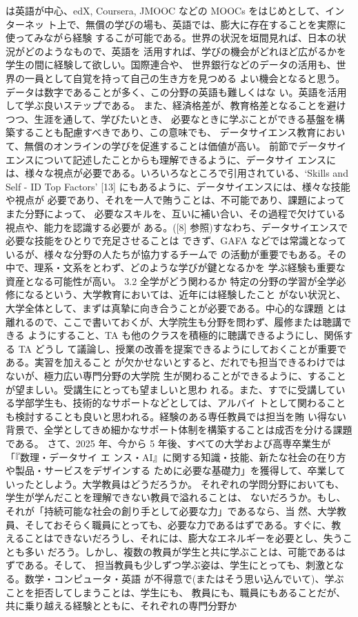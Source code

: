 \documentclass[
]{book}
\theoremstyle{definition}
\theoremstyle{definition}
\theoremstyle{definition}
\theoremstyle{definition}
\theoremstyle{remark}
\begin{document}
は英語が中心、edX, Coursera, JMOOC などの MOOCs をはじめとして、インターネッ ト上で、無償の学びの場も、英語では、膨大に存在することを実際に使ってみながら経験 するこが可能である。世界の状況を垣間見れば、日本の状況がどのようなもので、英語を 活用すれば、学びの機会がどれほど広がるかを学生の間に経験して欲しい。国際連合や、 世界銀行などのデータの活用も、世界の一員として自覚を持って自己の生き方を見つめる よい機会となると思う。データは数字であることが多く、この分野の英語も難しくはな い。英語を活用して学ぶ良いステップである。
また、経済格差が、教育格差となることを避けつつ、生涯を通して、学びたいとき、 必要なときに学ぶことができる基盤を構築することも配慮すべきであり、この意味でも、 データサイエンス教育において、無償のオンラインの学びを促進することは価値が高い。
前節でデータサイエンスについて記述したことからも理解できるように、データサイ エンスには、様々な視点が必要である。いろいろなところで引用されている、`Skills and Self - ID Top Factors' {[}13{]} にもあるように、データサイエンスには、様々な技能や視点が 必要であり、それを一人で賄うことは、不可能であり、課題によってまた分野によって、 必要なスキルを、互いに補い合い、その過程で欠けている視点や、能力を認識する必要が ある。({[}8{]} 参照)すなわち、データサイエンスで必要な技能をひとりで充足させることは できず、GAFA などでは常識となっているが、様々な分野の人たちが協力するチームで の活動が重要でもある。その中で、理系・文系をとわず、どのような学びが鍵となるかを 学ぶ経験も重要な資産となる可能性が高い。
3.2 全学がどう関わるか
特定の分野の学習が全学必修になるという、大学教育においては、近年には経験したこと がない状況と、大学全体として、まずは真摯に向き合うことが必要である。中心的な課題 とは離れるので、ここで書いておくが、大学院生も分野を問わず、履修または聴講できる ようにすること、TA も他のクラスを積極的に聴講できるようにし、関係する TA どうし て議論し、授業の改善を提案できるようにしておくことが重要である。実習を加えること が欠かせないとすると、だれでも担当できるわけではないが、極力広い専門分野の大学院 生が関わることができるように、することが望ましい。受講生にとっても望ましいと思わ れる。また、すでに受講している学部学生も、技術的なサポートなどとしては、アルバイ トとして関わることも検討することも良いと思われる。経験のある専任教員では担当を賄 い得ない背景で、全学としてきめ細かなサポート体制を構築することは成否を分ける課題 である。
さて、2025 年、今から 5 年後、すべての大学および高専卒業生が「『数理・データサイ エ ンス・AI』に関する知識・技能、新たな社会の在り方や製品・サービスをデザインする ために必要な基礎力」を獲得して、卒業していったとしよう。大学教員はどうだろうか。 それぞれの学問分野においても、学生が学んだことを理解できない教員で溢れることは、 ないだろうか。もし、それが「持続可能な社会の創り手として必要な力」であるなら、当 然、大学教員、そしておそらく職員にとっても、必要な力であるはずである。すぐに、教 えることはできないだろうし、それには、膨大なエネルギーを必要とし、失うことも多い だろう。しかし、複数の教員が学生と共に学ぶことは、可能であるはずである。そして、 担当教員も少しずつ学ぶ姿は、学生にとっても、刺激となる。数学・コンピュータ・英語 が不得意で(またはそう思い込んでいて)、学ぶことを拒否してしまうことは、学生にも、 教員にも、職員にもあることだが、共に乗り越える経験とともに、それぞれの専門分野か
\end{document}
